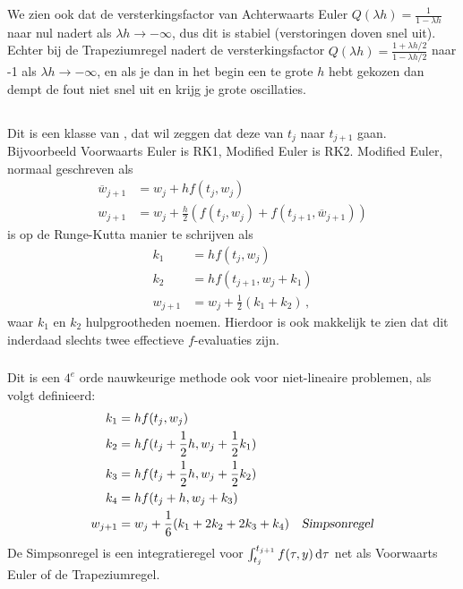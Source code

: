 \documentclass{2wn20summary}
\begin{document}
			We zien ook dat de versterkingsfactor van Achterwaarts Euler $Q(\lambda h)=\frac{1}{1-\lambda h}$ naar nul nadert als $\lambda h \to - \infty$, dus dit is stabiel (verstoringen doven snel uit). Echter bij de Trapeziumregel nadert de versterkingsfactor $Q(\lambda h)=\frac{1+\lambda h/2}{1-\lambda h/2}$ naar -1 als $\lambda h \to - \infty$, en als je dan in het begin een te grote $h$ hebt gekozen dan dempt de fout niet snel uit en krijg je grote oscillaties.
			
		\subsection{} 
			Dit is een klasse van , dat wil zeggen dat deze van $t_j$ naar $t_{j+1}$ gaan. Bijvoorbeeld Voorwaarts Euler is RK1, Modified Euler is RK2. Modified Euler, normaal geschreven als
			\begin{align*}
				\overline w_{j+1} &= w_j + h f(t_j,w_j) \\
				w_{j+1} &= w_j + \frac{h}{2} (f(t_j,w_j) + f(t_{j+1},\overline w_{j+1}))
			\end{align*}
			is op de Runge-Kutta manier te schrijven als
			\begin{align*}
				k_1 &= hf(t_j,w_j) \\
				k_2 &= hf(t_{j+1},w_j + k_1) \\
				w_{j+1} &= w_j + \frac{1}{2}(k_1 + k_2) \,,
			\end{align*}
			waar $k_1$ en $k_2$ hulpgrootheden noemen. Hierdoor is ook makkelijk te zien dat dit inderdaad slechts twee effectieve $f$-evaluaties zijn.
			
		\subsubsection{}
			Dit is een $4^e$ orde nauwkeurige methode ook voor niet-lineaire problemen, als volgt definieerd:
			\begin{align*}
				k_1 &= hf(t_j,w_j) \\
				k_2 &= h f(t_j+\frac{1}{2} h,w_j + \frac{1}{2}k_1) \\
				k_3 &= hf (t_j+\frac{1}{2}h,w_j + \frac{1}{2}k_2) \\
				k_4 &= hf(t_j + h,w_j + k_3) \\
				w_{j+1} &= w_j + \frac{1}{6} (k_1 + 2k_2 + 2k_3 + k_4)\quad \text {\indx{Simpsonregel}}
			\end{align*}
			De Simpsonregel is een integratieregel voor $\int_{t_j}^{t_{j+1}} f(\tau,y) \mathop{}\!\mathrm{d} \tau$ net als Voorwaarts Euler of de Trapeziumregel.
			
\end{document}

